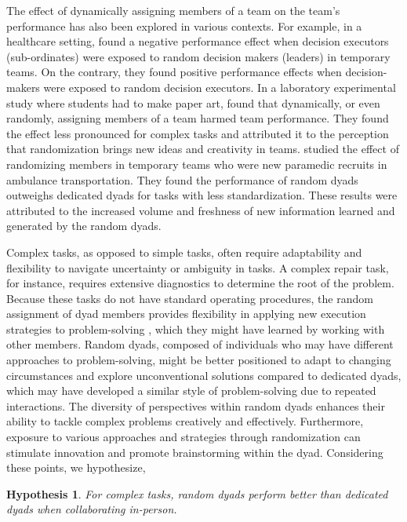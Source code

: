 \documentclass[msom,nonblindrev]{01 latex/class/informs3}
\newtheorem{hypothesis}{Hypothesis}
\begin{document}
The effect of dynamically assigning members of a team on the team's performance has also been explored in various contexts. For example, in a healthcare setting, \cite{kim2023learning} found a negative performance effect when decision executors (sub-ordinates) were exposed to random decision makers (leaders) in temporary teams. On the contrary, they found positive performance effects when decision-makers were exposed to random decision executors. In a laboratory experimental study where students had to make paper art, \citet{argote1995group} found that dynamically, or even randomly, assigning members of a team harmed team performance. They found the effect less pronounced for complex tasks and attributed it to the perception that randomization brings new ideas and creativity in teams. \citet{akcsin2021learning} studied the effect of randomizing members in temporary teams who were new paramedic recruits in ambulance transportation. They found the performance of random dyads outweighs dedicated dyads for tasks with less standardization. These results were attributed to the increased volume and freshness of new information learned and generated by the random dyads.

Complex tasks, as opposed to simple tasks, often require adaptability and flexibility to navigate uncertainty or ambiguity in tasks. A complex repair task, for instance, requires extensive diagnostics to determine the root of the problem. Because these tasks do not have standard operating procedures, the random assignment of dyad members provides flexibility in applying new execution strategies to problem-solving \citep{shostack1987service}, which they might have learned by working with other members. Random dyads, composed of individuals who may have different approaches to problem-solving, might be better positioned to adapt to changing circumstances and explore unconventional solutions compared to dedicated dyads, which may have developed a similar style of problem-solving due to repeated interactions. The diversity of perspectives within random dyads enhances their ability to tackle complex problems creatively and effectively. Furthermore, exposure to various approaches and strategies through randomization can stimulate innovation and promote brainstorming within the dyad. Considering these points, we hypothesize,

\begin{hypothesis}\label{h:onsite_complex}
For complex tasks, random dyads perform better than dedicated dyads when collaborating in-person.
\end{hypothesis}
\end{document}
